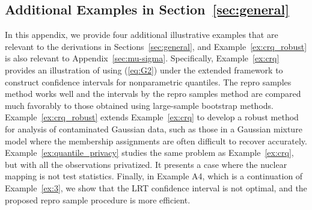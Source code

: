 \documentclass[12pt]{article}
\theoremstyle{shortspace}
\begin{document}
\subsection{Additional Examples in Section~\ref{sec:general}}
\label{sec:example_sec2}

In this appendix, we provide four additional illustrative examples that are relevant to the derivations in Sections~\ref{sec:general}, and Example~\ref{ex:crq_robust} is also relevant to Appendix~\ref{sec:mu-sigma}. Specifically, 
Example~\ref{ex:crq} provides an illustration of using (\ref{eq:G2}) 
under the extended framework
to construct confidence intervals for nonparametric quantiles. 
The repro samples method works well and the intervals by the repro samples method 
are compared much favorably to those obtained using large-sample 
bootstrap methods.  
Example~\ref{ex:crq_robust} extends  Example~\ref{ex:crq} to develop a robust method for analysis of 
contaminated Gaussian data, such as those in a Gaussian mixture model where the membership assignments are often difficult to recover accurately. Example~\ref{ex:quantile_privacy} studies the same problem as Example~\ref{ex:crq}, but with all the observations privatized. It presents a case where the nuclear mapping is not test statistics. Finally, in Example A4, which is a continuation of Example~\ref{ex:3}, we show that the LRT confidence interval is not optimal, and the proposed repro sample procedure is more efficient. 
\end{document}
